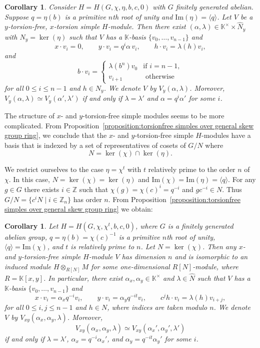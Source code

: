 \documentclass[11pt, twoside]{amsart}
\newtheorem{corollary}[theorem]{Corollary}
\theoremstyle{definition}
\newcommand{\ZZ}{\mathbb{Z}}
\newcommand{\KK}{\mathbb{K}}
\begin{document}
%
\begin{corollary}\label{cor:y-torsionfree-x-torsion-simples}
Consider $H=H(G,\chi,\eta,b,c,0)$ with $G$ finitely generated abelian.
Suppose $q=\eta(b)$ is a primitive $n$th root of unity and
$\mathrm{Im}(\eta)=\langle q\rangle$.
Let $V$ be a $y$-torsion-free, $x$-torsion simple $H$-module.
Then there exist $(\alpha,\lambda)\in \KK^\times\times\widehat{N}_y$ with
$N_y=\ker(\eta)$ such that $V$ has a $\KK$-basis $\{v_0,\ldots,v_{n-1}\}$ and
\[
x\cdot v_i=0,\qquad y\cdot v_i=q^i\alpha\,v_i,\qquad h\cdot v_i=\lambda(h)v_i,
\]
and
\[
b\cdot v_i=\begin{cases}
\lambda(b^n)v_0 & \text{if } i=n-1,\\
v_{i+1} & \text{ otherwise}
\end{cases}
\]
for all $0\le i\le n-1$ and $h\in N_y$.
We denote $V$ by $V_y(\alpha,\lambda)$.
Moreover, $V_y(\alpha,\lambda)\simeq V_y(\alpha',\lambda')$ if and only if
$\lambda=\lambda'$ and $\alpha=q^i\alpha'$ for some $i$.
\end{corollary}

The structure of $x$- and $y$-torsion-free simple modules seems to be more complicated. From Proposition~\ref{proposition:torsionfree simples over general skew group ring}, we conclude that the $x$- and $y$-torsion-free simple $H$-modules have a basis that is indexed by a set of representatives of cosets of $G/N$ where 
%
\[N = \ker(\chi) \cap \ker(\eta).\]
%

We restrict ourselves to the case $\eta = \chi^t$ with $t$ relatively prime to the order $n$ of $\chi$. In this case, 
$N = \ker(\chi)  = \ker(\eta)$ and $\mathrm{Im}(\chi)=\mathrm{Im}(\eta) = \langle q\rangle$. 
For any  $g \in G$ there exists $i \in \ZZ$ such that $\chi(g) = \chi(c)^i = q^{-i}$ and $gc^{-i} \in N$. Thus $G/N = \{c^i N \mid i \in \ZZ_n\}$ has order $n$.  From Proposition~\ref{proposition:torsionfree simples over general skew group ring} we obtain:
%
\begin{corollary}\label{x-y-torsionfree-skewgroupcase}
Let $H=H(G,\chi,\chi^t,b,c,0)$, where $G$ is a finitely generated abelian group,
$q=\eta(b) = \chi(c)^{-1}$ is a primitive $n$th root of unity,
$\langle q\rangle=\mathrm{Im}(\chi)$, and $t$ is relatively prime to $n$.
Let $N=\ker(\chi)$.
Then any $x$- and $y$-torsion-free simple $H$-module $V$ has dimension $n$
and is isomorphic to an induced module $H\otimes_{R[N]}M$ for some
one-dimensional $R[N]$-module, where $R=\KK[x,y]$.
In particular, there exist $\alpha_x,\alpha_y\in\KK^\times$ and
$\lambda\in\widehat{N}$ such that $V$ has a $\KK$-basis
$\{v_0,\ldots,v_{n-1}\}$ and
\[
x\cdot v_i=\alpha_x q^{-i}v_i,\qquad
y\cdot v_i=\alpha_y q^{-it}v_i,\qquad
c^j h\cdot v_i=\lambda(h)v_{i+j},
\]
for all $0\le i,j\le n-1$ and $h\in N$, where indices are taken modulo $n$.
We denote $V$ by $V_{xy}(\alpha_x,\alpha_y,\lambda)$.
Moreover,
\[
V_{xy}(\alpha_x,\alpha_y,\lambda)\simeq
V_{xy}(\alpha_x',\alpha_y',\lambda')
\]
if and only if $\lambda=\lambda'$, $\alpha_x=q^{-i}\alpha_x'$, and
$\alpha_y=q^{-it}\alpha_y'$ for some $i$.
\end{corollary}
\end{document}
